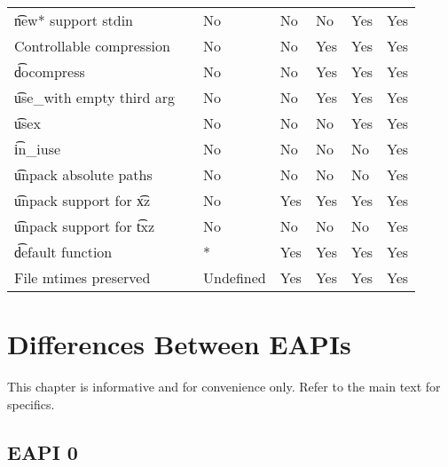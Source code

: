 \begin{landscape}
\begin{longtable}{llP{7.5em}P{7.5em}P{7.5em}P{7.5em}P{7.5em}}
\t{new*} support stdin &  &
    No & No & No & Yes & Yes \\

Controllable compression &  &
    No & No & Yes & Yes & Yes \\

\t{docompress} &  &
    No & No & Yes & Yes & Yes \\

\t{use\_with} empty third arg &  &
    No & No & Yes & Yes & Yes \\

\t{usex} &  &
    No & No & No & Yes & Yes \\

\t{in\_iuse} &  &
    No & No & No & No & Yes \\

\t{unpack} absolute paths &  &
    No & No & No & No & Yes \\

\t{unpack} support for \t{xz} &  &
    No & Yes & Yes & Yes & Yes \\

\t{unpack} support for \t{txz} &  &
    No & No & No & No & Yes \\

\t{default} function &  &
    * & Yes & Yes & Yes & Yes \\

File mtimes preserved &  &
    Undefined & Yes & Yes & Yes & Yes \\

\end{longtable}
\end{landscape}

\chapter{Differences Between EAPIs}

\note This chapter is informative and for convenience only. Refer to the main text for specifics.

\section*{EAPI 0}

